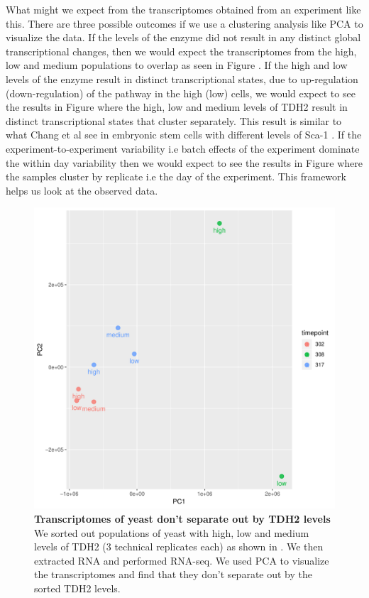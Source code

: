 What might we expect from the transcriptomes obtained from an experiment like this. There are three possible outcomes if we use a clustering analysis like PCA to visualize the data. If the levels of the enzyme did not result in any distinct global transcriptional changes, then we would expect the transcriptomes from the high, low and medium populations to overlap as seen in Figure . If the high and low levels of the enzyme result in distinct transcriptional states, due to up-regulation (down-regulation) of the pathway in the high (low) cells, we would expect to see the results in Figure  where the high, low and medium levels of TDH2 result in distinct transcriptional states that cluster separately. This result is similar to what Chang et al see in embryonic stem cells with different levels of Sca-1 \cite{chang2008n}. If the experiment-to-experiment variability i.e batch effects of the experiment dominate the within day variability then we would expect to see the results in Figure  where the samples cluster by replicate i.e the day of the experiment. This framework helps us look at the observed data.

\begin{figure}[t!]  
    \centering
    \includegraphics[width=\linewidth, scale=0.5]{figures/intro/intro_tdh2_clustering_timepoints.pdf}
    \caption[Transcriptomes of yeast don't separate out by TDH2 levels]{%
     	\textbf{Transcriptomes of yeast don't separate out by TDH2 levels}
     	We sorted out populations of yeast with high, low and medium levels of TDH2 (3 technical replicates each) as shown in . We then extracted RNA and performed RNA-seq. We used PCA to visualize the transcriptomes and find that they don't separate out by the sorted TDH2 levels.
    }
    \label{fig:intro5}
\end{figure}

